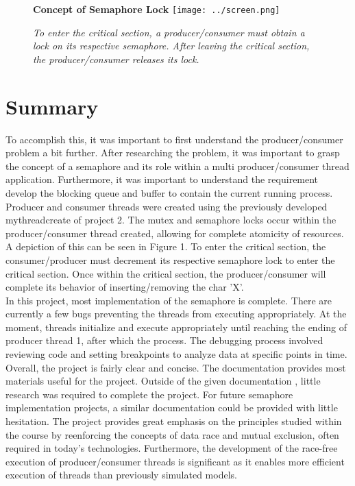 \documentclass[11pt]{article} %
\newcommand{\tab}{\hspace*{2em}}
\begin{document}
\begin{figure}
\centering
\textbf{Concept of Semaphore Lock}
\texttt{[image: ../screen.png]}
\caption{\emph{To enter the critical section, a producer/consumer must obtain a lock on its respective semaphore.  After leaving the critical section, the producer/consumer releases its lock.}}
\end{figure}

\section{Summary}
\tab To accomplish this, it was important to first understand the producer/consumer problem a bit further.  After researching the problem, it was important to grasp the concept of a semaphore and its role within a multi producer/consumer thread application.  Furthermore, it was important to understand the requirement develop the blocking queue and buffer to contain the current running process.  Producer and consumer threads were created using the previously developed mythread\textunderscore create of project 2.  The mutex and semaphore locks occur within the producer/consumer thread created, allowing for complete atomicity of resources.  A depiction of this can be seen in Figure 1.  To enter the critical section, the consumer/producer must decrement its respective semaphore lock to enter the critical section.  Once within the critical section, the producer/consumer will complete its behavior of inserting/removing the char 'X'.\\
\tab In this project, most implementation of the semaphore is complete.  There are currently a few bugs preventing the threads from executing appropriately.  At the moment, threads initialize and execute appropriately until reaching the ending of producer thread 1, after which the process.  The debugging process involved reviewing code and setting breakpoints to analyze data at specific points in time.\\
\tab Overall, the project is fairly clear and concise.  The documentation provides most materials useful for the project.  Outside of the given documentation , little research was required to complete the project.  For future semaphore implementation projects, a similar documentation could be provided with little hesitation.  The project provides great emphasis on the principles studied within the course by reenforcing the concepts of data race and mutual exclusion, often required in today's technologies.   Furthermore, the development of the race-free execution of producer/consumer threads is significant as it enables more efficient execution of threads than previously simulated models.  \\
\end{document}
